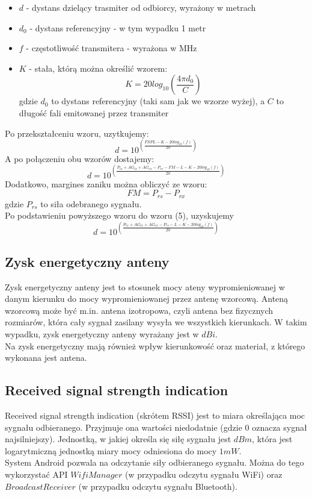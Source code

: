 \documentclass{article}
\begin{document}
		  \begin{itemize}
		  	\item $d$ - dystans dzielący trasmiter od odbiorcy, wyrażony w metrach
		  	\item $d_{0}$ - dystans referencyjny -  w tym wypadku 1 metr
		  	\item $f$ - częstotliwość transmitera - wyrażona w MHz
		  	\item $K$ - stała, którą można określić wzorem:
			  	\begin{equation}
				  	K = 20log_{10}\left(\frac{4\pi d_{0}}{C}\right)
			  	\end{equation}
			  	gdzie $d_{0}$ to dystans referencyjny (taki sam jak we wzorze wyżej), a $C$ to długość fali emitowanej przez transmiter
		  \end{itemize}	  
		  Po przekształceniu wzoru, uzytkujemy:
		  \begin{equation}
			  d = 10^{\left(\frac{FSPL - K - 20log_{10}(f)}{20}\right)}
		  \end{equation}
		  A po połączeniu obu wzorów dostajemy:
		  \begin{equation}
		  d = 10^{\left(\frac{P_{tx} + AG_{tx} + AG_{rx} - P_{rx} - FM - L - K - 20log_{10}(f)}{20}\right)}
		  \end{equation}
		  Dodatkowo, margines zaniku można obliczyć ze wzoru:
		  \begin{equation}
			  FM = P_{rs} - P_{rx}
		  \end{equation}
		  gdzie $P_{rs}$ to siła odebranego sygnału.\\
		  Po podstawieniu powyższego wzoru do wzoru (5), uzyskujemy
		  \begin{equation}
		  d = 10^{\left(\frac{P_{tx} + AG_{tx} + AG_{rx} - P_{rs} - L - K - 20log_{10}(f)}{20}\right)}
		  \end{equation}
		\subsection{Zysk energetyczny anteny}
			Zysk energetyczny anteny jest to stosunek mocy ateny wypromieniowanej w danym kierunku do mocy wypromieniowanej przez antenę wzorcową. Anteną wzorcową może być m.in. antena izotropowa, czyli antena bez fizycznych rozmiarów, która cały sygnał zasilany wysyła we wszystkich kierunkach. W takim wypadku, zysk energetyczny anteny wyrażany jest w $dBi$.\\
			Na zysk energetyczny mają również wpływ kierunkowość oraz materiał, z którego wykonana jest antena.
		\subsection{Received signal strength indication}
			Received signal strength indication (skrótem RSSI) jest to miara określająca moc sygnału odbieranego. Przyjmuje ona wartości niedodatnie (gdzie 0 oznacza sygnał najsilniejszy). Jednostką, w jakiej określa się siłę sygnału jest $dBm$, która jest logarytmiczną jednostką miary mocy odniesiona do mocy $1mW$.\\
			System Android pozwala na odczytanie siły odbieranego sygnału. Można do tego wykorzystać API $WifiManager$ (w przypadku odczytu sygnału WiFi) oraz $BroadcastReceiver$ (w przypadku odczytu sygnału Bluetooth).
\end{document}
